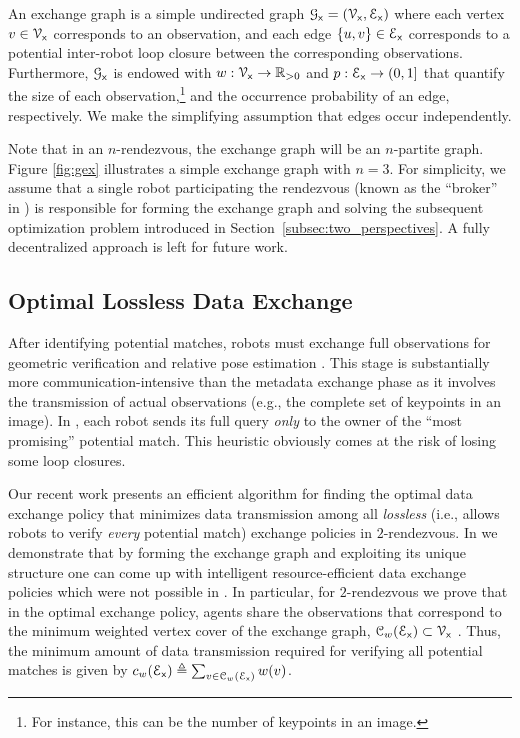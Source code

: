 \documentclass[conference]{IEEEtran}
\begin{document}
\begin{definition}
	\label{def:exchange_graph}
	An exchange graph \cite{Giamou18_ICRA} is a simple undirected
	graph $\mathcal{G}_\mathsf{x} = (\mathcal{V}_\mathsf{x},\mathcal{E}_\mathsf{x})$ where each vertex $v \in \mathcal{V}_\mathsf{x}$ corresponds to
	an observation, and each edge $\{u,v\} \in \mathcal{E}_\mathsf{x}$ corresponds to a potential
	inter-robot loop closure between the corresponding observations.
	Furthermore, $\mathcal{G}_\mathsf{x}$ is endowed with $w : \mathcal{V}_\mathsf{x} \to
	\mathbb{R}_{>0}$ and $p : \mathcal{E}_\mathsf{x} \to (0,1]$ that quantify the size of each
	observation,\footnote{For instance, this can be the number of keypoints in an
	  image.}
	and the occurrence probability of an edge, respectively.
	We make the simplifying assumption that edges occur independently.
\end{definition}
	Note that in an $n$-rendezvous, the exchange graph will be an $n$-partite
	graph. Figure \ref{fig:gex} illustrates a simple exchange graph with $n = 3$.
	For simplicity, we assume that a single robot 
	participating the rendezvous (known as the ``broker'' in \cite{Giamou18_ICRA})
	is responsible for
	forming the exchange graph and solving the subsequent optimization problem introduced in Section~\ref{subsec:two_perspectives}.
	A fully decentralized approach is left for future work.


\subsection{Optimal Lossless Data Exchange}
\label{sec:optLossless}
After identifying potential matches, robots must exchange full observations for geometric
verification and relative pose estimation \cite{Giamou18_ICRA}. 
This stage is substantially more communication-intensive than the metadata exchange phase as it involves the transmission of
actual observations (e.g., 
the complete set of keypoints in an image).
In
\cite{CieslewskiS17,cieslewski2017efficient}, each robot sends its full query
\emph{only} to the owner of the ``most promising'' potential match.
This heuristic obviously comes at the risk of losing some loop closures.

Our recent work \cite{Giamou18_ICRA} presents an efficient algorithm for finding the optimal
data exchange policy that minimizes data transmission among all \emph{lossless} (i.e., allows robots to verify
\emph{every} potential
match) exchange policies in $2$-rendezvous.
In \cite{Giamou18_ICRA} we demonstrate that by forming
the exchange graph and exploiting its unique structure one can come up with intelligent
resource-efficient data exchange policies which were not possible in
\cite{CieslewskiS17,cieslewski2017efficient}.
In particular, for $2$-rendezvous we prove that 
in the optimal exchange policy,
agents share the observations that correspond to the minimum weighted vertex
cover of the exchange graph, $\mathcal{C}_w(\mathcal{E}_\mathsf{x}) \subset \mathcal{V}_\mathsf{x}$ \cite{Giamou18_ICRA}. 
Thus, the
minimum amount of data transmission required for verifying all potential matches is
given by $c_w(\mathcal{E}_\mathsf{x}) \triangleq \sum_{v \in \mathcal{C}_w(\mathcal{E}_\mathsf{x})} w(v)$.
\end{document}
